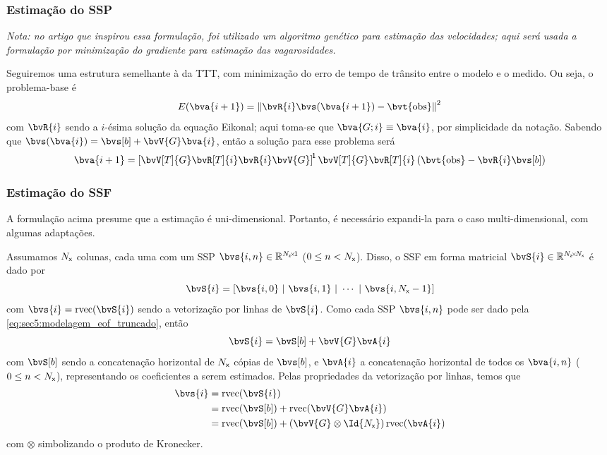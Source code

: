\subsubsection*{Estimação do SSP}
\textsl{\footnotesize{} Nota: no artigo que inspirou essa formulação, foi utilizado um algoritmo genético para estimação das velocidades; aqui será usada a formulação por minimização do gradiente para estimação das vagarosidades.}

Seguiremos uma estrutura semelhante à da TTT, com minimização do erro de tempo de trânsito entre o modelo e o medido. Ou seja, o problema-base é
\begin{equation}
	E(\bva{i+1}) = \norm{\bvR{i} \bvs(\bva{i+1}) - \bvt{\obs}}^2
\end{equation}
com $\bvR{i}$ sendo a $i$-ésima solução da equação Eikonal; aqui toma-se que $\bva{G;i} \equiv \bva{i}$, por simplicidade da notação. Sabendo que $\bvs(\bva{i}) = \bvs[b] + \bvV{G} \bva{i}$, então a solução para esse problema será
\begin{equation}
	\bva{i+1} = \inv*{\bvV[T]{G} \bvR[T]{i} \bvR{i} \bvV{G}} \bvV[T]{G} \bvR[T]{i} \pts{ \bvt{\obs} - \bvR{i} \bvs[b] }
\end{equation}

\subsubsection*{Estimação do SSF}
A formulação acima presume que a estimação é uni-dimensional. Portanto, é necessário expandi-la para o caso multi-dimensional, com algumas adaptações.

Assumamos $N_{{\textsf{x}}}$ colunas, cada uma com um SSP $\bvs{i,n} \in \re^{\sz{N_{\z}}{1}}$ ($0 \leq n < N_{{\textsf{x}}}$). Disso, o SSF em forma matricial $\bvS{i} \in \re^{\sz{N_{\z}}{N_{\x}}}$ é dado por
\begin{equation}
	\bvS{i} = \bts{\bvs{i,0}~|~\bvs{i,1}~|~\cdots~|~\bvs{i,N_{\x}-1} }
\end{equation}
com $\bvs{i} = \rvec(\bvS{i})$ sendo a vetorização por linhas de $\bvS{i}$. Como cada SSP $\bvs{i,n}$ pode ser dado pela \cref{eq:sec5:modelagem_eof_truncado}, então
\begin{equation}
	\bvS{i} = \bvS[b] + \bvV{G} \bvA{i}
\end{equation}
com $\bvS[b]$ sendo a concatenação horizontal de $N_{{\textsf{x}}}$ cópias de $\bvs[b]$, e $\bvA{i}$ a concatenação horizontal de todos os $\bva{i,n}$ ($0 \leq n < N_{{\textsf{x}}}$), representando os coeficientes a serem estimados. Pelas propriedades da vetorização por linhas, temos que
\begin{equation}
	\begin{split}
		\bvs{i}
		& = \rvec(\bvS{i}) \\
		& = \rvec(\bvS[b]) + \rvec(\bvV{G} \bvA{i}) \\
		& = \rvec(\bvS[b]) + \pts{\bvV{G} \otimes \Id{N_{\x}}} \rvec(\bvA{i})
	\end{split}
	\label{eq:sec5:estimacao_ssf_otimizada_basica}
\end{equation}
com $\otimes$ simbolizando o produto de Kronecker.

